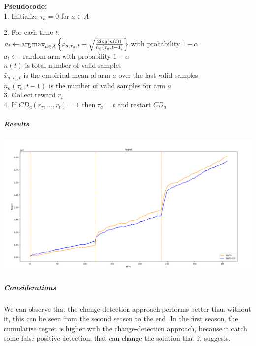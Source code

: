 \textbf{Pseudocode:}\\

1. Initialize $\tau_{a} = 0$ for $a\in A$ 

2. For each time $t$:\\

\hspace{0.8cm} $a_{t} \leftarrow \operatorname{arg\,max}_{a \in A}{\left\{\bar{x}_{a,\tau_{a},t} + \sqrt{\frac{2 log(n(t))}{{n_{a}(\tau_{a},t-1)}} }\right\}}$ with probability $1-\alpha$\\

\hspace{0.8cm} $a_{t} \leftarrow$ random arm with probability $1-\alpha$ \\

$n(t)$	is total number of valid samples\\

$\bar{x}_{a,\tau_{a},t}$ is the empirical mean of arm $a$ over the last valid samples\\

$n_{a}(\tau_{a},t-1)$ is the number of valid samples for arm $a$\\

3. Collect reward $r_t$\\

4. If $CD_a (r_{\tau},...,r_t) = 1$ then $\tau_a = t$ and restart $CD_a$

\subparagraph*{Results}
\begin{center}
	\includegraphics[scale=0.35]{Images/n8}
\end{center}
\subparagraph*{Considerations}
We can observe that the change-detection approach performs better than without it, this can be seen from the second season to the end. In the first season, the cumulative regret is higher with the change-detection approach, because it catch some false-positive detection, that can change the solution that it suggests.